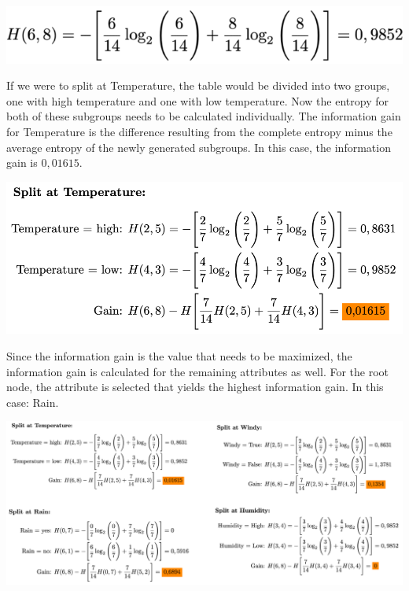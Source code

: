 \documentclass[
12pt,
headsepline,
bibliography=totoc,
twoside=semi,
fleqn
]{scrartcl}
\begin{document}
 \begin{center}\includegraphics[scale=0.7]{BDT8.png}\label{fig:fig8}\end{center}

 If we were to split at Temperature, the table would be divided into two groups, one with high temperature and one with low temperature. Now the entropy for both of these subgroups needs to be calculated individually. The information gain for Temperature is the difference resulting from the complete entropy minus the average entropy of the newly generated subgroups. In this case, the information gain is $0,01615$. 

 \begin{center}\includegraphics[scale=0.7]{BDT7.png}\label{fig:fig7}\end{center}

 Since the information gain is the value that needs to be maximized, the information gain is calculated for the remaining attributes as well. For the root node, the attribute is selected that yields the highest information gain. In this case: Rain. 

 \begin{center}\includegraphics[scale=0.7]{BDT9.png}\label{fig:fig9}\end{center}
\end{document}
